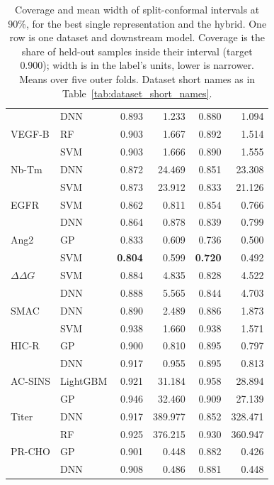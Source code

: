 \begin{table}[htbp]
\begin{tabular}{@{}llrrrr@{}}
 & DNN & 0.893 & 1.233 & 0.880 & 1.094 \\
VEGF-B & RF & 0.903 & 1.667 & 0.892 & 1.514 \\
 & SVM & 0.903 & 1.666 & 0.890 & 1.555 \\
Nb-Tm & DNN & 0.872 & 24.469 & 0.851 & 23.308 \\
 & SVM & 0.873 & 23.912 & 0.833 & 21.126 \\
EGFR & SVM & 0.862 & 0.811 & 0.854 & 0.766 \\
 & DNN & 0.864 & 0.878 & 0.839 & 0.799 \\
Ang2 & GP & 0.833 & 0.609 & 0.736 & 0.500 \\
 & SVM & \textbf{0.804} & 0.599 & \textbf{0.720} & 0.492 \\
$\Delta\Delta G$ & SVM & 0.884 & 4.835 & 0.828 & 4.522 \\
 & DNN & 0.888 & 5.565 & 0.844 & 4.703 \\
SMAC & DNN & 0.890 & 2.489 & 0.886 & 1.873 \\
 & SVM & 0.938 & 1.660 & 0.938 & 1.571 \\
HIC-R & GP & 0.900 & 0.810 & 0.895 & 0.797 \\
 & DNN & 0.917 & 0.955 & 0.895 & 0.813 \\
AC-SINS & LightGBM & 0.921 & 31.184 & 0.958 & 28.894 \\
 & GP & 0.946 & 32.460 & 0.909 & 27.139 \\
Titer & DNN & 0.917 & 389.977 & 0.852 & 328.471 \\
 & RF & 0.925 & 376.215 & 0.930 & 360.947 \\
PR-CHO & GP & 0.901 & 0.448 & 0.882 & 0.426 \\
 & DNN & 0.908 & 0.486 & 0.881 & 0.448 \\
\bottomrule
\end{tabular}
\caption[Coverage and width of 90\% conformal intervals.]{Coverage and mean width of split-conformal intervals at 90\%, for the best single representation and the hybrid. One row is one dataset and downstream model. Coverage is the share of held-out samples inside their interval (target 0.900); width is in the label's units, lower is narrower. Means over five outer folds. Dataset short names as in Table~\ref{tab:dataset_short_names}.}
\label{tab:method:conformal}
\end{table}

\label{app:add:separate_sites}


